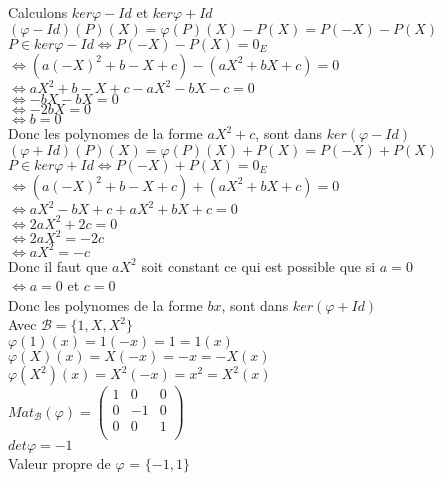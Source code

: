 \documentclass{article}
\begin{document}
\noindent Calculons $ker \varphi - Id$ et $ker \varphi + Id$\\
$(\varphi - Id)(P)(X) = \varphi(P)(X) - P(X) = P(-X) - P(X)$\\
$P \in ker \varphi - Id \Leftrightarrow  P(-X) - P(X) = 0_E$\\
$\Leftrightarrow (a(-X)^2 + b -X + c) - (aX^2 + b X + c) = 0$\\
$\Leftrightarrow aX^2 + b -X + c -aX^2 -b X - c = 0$\\
$\Leftrightarrow -bX -bX = 0$\\
$\Leftrightarrow -2bX = 0$\\
$\Leftrightarrow b = 0$\\
Donc les polynomes de la forme $aX^2 + c$, sont dans $ker (\varphi - Id)$\\
$(\varphi + Id)(P)(X) = \varphi(P)(X) + P(X) = P(-X) + P(X)$\\
$P \in ker \varphi + Id \Leftrightarrow  P(-X) + P(X) = 0_E$\\
$\Leftrightarrow (a(-X)^2 + b -X + c) + (aX^2 + b X + c) = 0$\\
$\Leftrightarrow aX^2 -bX + c + aX^2 + bX + c = 0$\\
$\Leftrightarrow 2aX^2 + 2c = 0$\\
$\Leftrightarrow 2aX^2 = -2c$\\
$\Leftrightarrow aX^2 = -c$\\
Donc il faut que $aX^2$ soit constant ce qui est possible que si $a = 0$\\
$\Leftrightarrow a = 0$ et $c = 0$\\
Donc les polynomes de la forme $bx$, sont dans $ker (\varphi + Id)$\\
Avec $\mathcal{B} = \{1, X, X^2\}$\\
$\varphi(1)(x) = 1(-x) = 1 = 1(x)$\\
$\varphi(X)(x) = X(-x) = -x = -X(x)$\\
$\varphi(X^2)(x) = X^2(-x) = x^2 = X^2(x)$\\
$Mat_\mathcal{B}(\varphi) = \begin{pmatrix}
    1 & 0 & 0\\
    0 & -1 & 0\\
    0 & 0 & 1\\
\end{pmatrix}$\\
$det \varphi = -1$\\
Valeur propre de $\varphi$ = $\{-1, 1\}$
\end{document}
